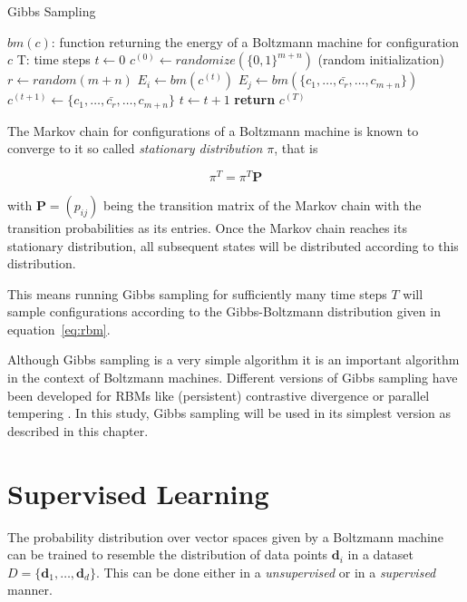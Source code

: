 \begin{algorithm}[H]
    \label{alg:gibbs}
    \caption{Gibbs Sampling}\label{euclid}
    \begin{algorithmic}[1]
        \Require $bm(c)$: function returning the energy of a Boltzmann machine for configuration $c$
        \Require T: time steps
        \State $t\gets 0$
        \State $c^{(0)} \gets randomize(\{0,1\}^{m+n})$ (random initialization)
        \Repeat
            \State $r \gets random(m+n)$
            \State $E_i \gets bm(c^{(t)})$
            \State $E_j \gets bm(\{c_1,\dots,\bar{c_r},\dots,c_{m+n}\})$
                \State $c^{(t+1)} \gets \{c_1,\dots,\bar{c_r},\dots,c_{m+n}\}$
            \EndIf
            \State $t\gets t+1$
        \State \textbf{return} $c^{(T)}$
    \end{algorithmic}
\end{algorithm}

The Markov chain for configurations of a Boltzmann machine is known to converge to it so called 
\textit{stationary distribution} $\pi$, that is

\begin{equation}
    \pi^T=\pi^T\bm{P}
\end{equation}

with $\bm{P} = (p_{ij})$ being the transition matrix of the Markov chain with the transition probabilities as its entries.
Once the Markov chain reaches its stationary distribution, all subsequent states will be distributed 
according to this distribution.

This means running Gibbs sampling for 
sufficiently many time steps $T$ will sample configurations according 
to the Gibbs-Boltzmann distribution given in equation~\ref{eq:rbm}.

Although Gibbs sampling is a very simple algorithm it is an important algorithm in the context of 
Boltzmann machines. Different versions of Gibbs sampling have been developed for RBMs like 
(persistent) contrastive divergence \cite{hinton2002training, tieleman2008training} or parallel tempering \cite{desjardins2010parallel}. In this study,
Gibbs sampling will be used in its simplest version as described in this chapter.
    
\section{Supervised Learning}
\label{sec:learning}
The probability distribution over vector spaces given by a Boltzmann machine can be trained to 
resemble the distribution of data points $\bm{d}_i$ in a dataset $D=\{\bm{d}_1,\dots,\bm{d}_d\}$. This can be done either in a \textit{unsupervised}
or in a \textit{supervised} manner.

